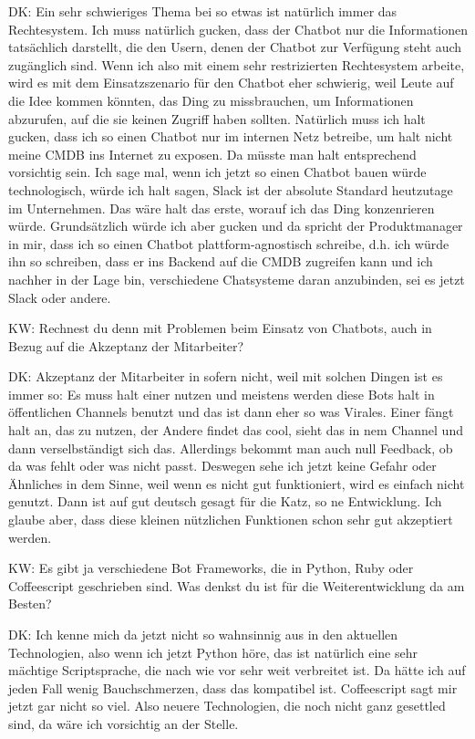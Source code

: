 \begin{list}{X:}{\setlength{\labelsep}{5mm}}
\item[DK:] Ein sehr schwieriges Thema bei so etwas ist natürlich immer das Rechtesystem. Ich muss natürlich gucken, dass der Chatbot nur die Informationen tatsächlich darstellt, die den Usern, denen der Chatbot zur Verfügung steht auch zugänglich sind. Wenn ich also mit einem sehr restrizierten Rechtesystem arbeite, wird es mit dem Einsatzszenario für den Chatbot eher schwierig, weil Leute auf die Idee kommen könnten, das Ding zu missbrauchen, um Informationen abzurufen, auf die sie keinen Zugriff haben sollten. Natürlich muss ich halt gucken, dass ich so einen Chatbot nur im internen Netz betreibe, um halt nicht meine CMDB ins Internet zu exposen. Da müsste man halt entsprechend vorsichtig sein. Ich sage mal, wenn ich jetzt so einen Chatbot bauen würde technologisch, würde ich halt sagen, Slack ist der absolute Standard heutzutage im Unternehmen. Das wäre halt das erste, worauf ich das Ding konzenrieren würde. Grundsätzlich würde ich aber gucken und da spricht der Produktmanager in mir, dass ich so einen Chatbot plattform-agnostisch schreibe, d.h. ich würde ihn so schreiben, dass er ins Backend auf die CMDB zugreifen kann und ich nachher in der Lage bin, verschiedene Chatsysteme daran anzubinden, sei es jetzt Slack oder andere.
\item[KW:] Rechnest du denn mit Problemen beim Einsatz von Chatbots, auch in Bezug auf die Akzeptanz der Mitarbeiter?
\item[DK:] Akzeptanz der Mitarbeiter in sofern nicht, weil mit solchen Dingen ist es immer so: Es muss halt einer nutzen und meistens werden diese Bots halt in öffentlichen Channels benutzt und das ist dann eher so was Virales. Einer fängt halt an, das zu nutzen, der Andere findet das cool, sieht das in nem Channel und dann verselbständigt sich das. Allerdings bekommt man auch null Feedback, ob da was fehlt oder was nicht passt. Deswegen sehe ich jetzt keine Gefahr oder Ähnliches in dem Sinne, weil wenn es nicht gut funktioniert, wird es einfach nicht genutzt. Dann ist auf gut deutsch gesagt für die Katz, so ne Entwicklung. Ich glaube aber, dass diese kleinen nützlichen Funktionen schon sehr gut akzeptiert werden.
\item[KW:] Es gibt ja verschiedene Bot Frameworks, die in Python, Ruby oder Coffeescript geschrieben sind. Was denkst du ist für die Weiterentwicklung da am Besten?
\item[DK:] Ich kenne mich da jetzt nicht so wahnsinnig aus in den aktuellen Technologien, also wenn ich jetzt Python höre, das ist natürlich eine sehr mächtige Scriptsprache, die nach wie vor sehr weit verbreitet ist. Da hätte ich auf jeden Fall wenig Bauchschmerzen, dass das kompatibel ist. Coffeescript sagt mir jetzt gar nicht so viel. Also neuere Technologien, die noch nicht ganz gesettled sind, da wäre ich vorsichtig an der Stelle.

\end{list}
